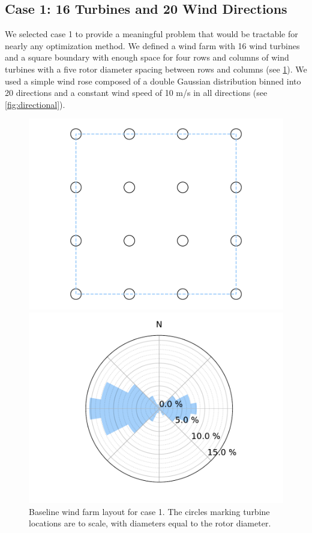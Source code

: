 \documentclass[journal abbreviation, manuscript]{copernicus}
\begin{document}
	\subsection{Case 1: 16 Turbines and 20 Wind Directions}
	We selected case 1 to provide a meaningful problem that would be tractable for nearly any optimization method. We defined a wind farm with 16 wind turbines and a square boundary with enough space for four rows and columns of wind turbines with a five rotor diameter spacing between rows and columns (see \ref{fig:layout1}). We used a simple wind rose composed of a double Gaussian distribution binned into 20 directions and a constant wind speed of 10 m/s in all directions (see \ref{fig:directional}).
	\begin{figure}[h!]
		\centering
		\begin{minipage}[t]{18pc}
			\centering
			\includegraphics[width=1.\textwidth, trim={1.5cm, 0cm, 1.5cm, 0cm}, clip]{final_images/layouts/16_turb_start.pdf}
			\caption{Baseline wind farm layout for case 1. The circles marking turbine locations are to scale, with diameters equal to the rotor diameter.}
			\label{fig:layout1}
		\end{minipage}\hspace{1pc}%
		\begin{minipage}[t]{18pc}
			\centering
			\includegraphics[width=\textwidth, trim={2.0cm 0cm 2.0cm 0cm}, clip]{final_images/windroses/freqwindrose_20_dir.pdf}

\end{minipage}
\end{figure}
\end{document}
